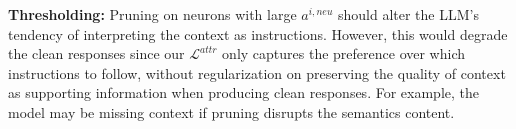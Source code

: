 \vspace{1mm}
\noindent\textbf{Thresholding:}
Pruning on neurons with large $a^{i,neu}$ should alter the LLM’s tendency of interpreting the context as instructions.
However, this would degrade the clean responses since our $\mathcal L^{attr}$ only captures the preference over which instructions to follow, 
without regularization on preserving the quality of context as supporting information when producing clean responses.
For example, the model may be missing context if pruning disrupts the semantics content.



